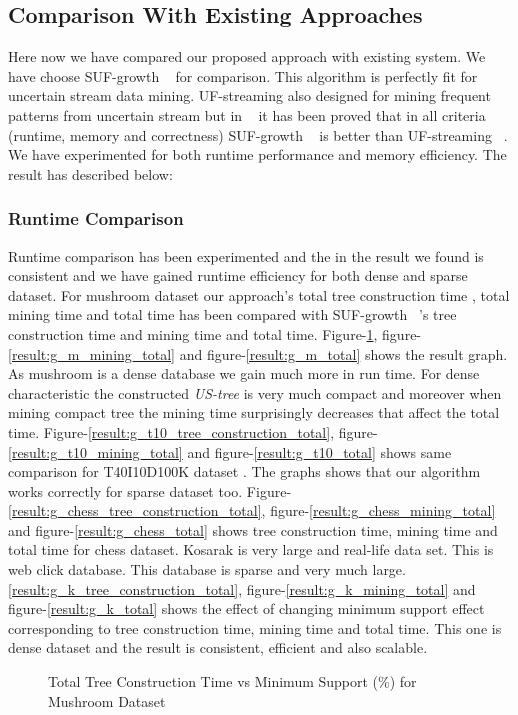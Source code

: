 \subsection{Comparison With Existing Approaches}
Here now we have compared our proposed approach with existing system. We have choose SUF-growth ~\cite{suf_growth}  for comparison. This algorithm is perfectly fit for uncertain stream data mining. UF-streaming also designed for mining frequent patterns from uncertain stream but in ~\cite{suf_growth} it has been proved that in all criteria (runtime, memory and correctness) SUF-growth ~\cite{suf_growth} is better than UF-streaming ~\cite{suf_growth}. We have experimented for both runtime performance and memory efficiency. The result has described below:
    \subsubsection{Runtime Comparison}
    Runtime comparison has been experimented and the in the result we found is consistent and we have gained runtime efficiency for both dense and sparse dataset. For mushroom dataset our approach's total tree construction time , total mining time and total time has been compared with SUF-growth ~\cite{suf_growth}'s tree construction time and mining time and total time. Figure-\ref{result:g_m_tree_construction_total}, figure-\ref{result:g_m_mining_total} and figure-\ref{result:g_m_total} shows the result graph. As mushroom is a dense database we gain much more in run time. For dense characteristic the constructed \emph{US-tree} is very much compact and moreover when mining compact tree the mining time surprisingly decreases that affect the total time. Figure-\ref{result:g_t10_tree_construction_total}, figure-\ref{result:g_t10_mining_total} and figure-\ref{result:g_t10_total} shows same comparison for T40I10D100K dataset . The graphs shows that our algorithm works correctly for sparse dataset too. Figure-\ref{result:g_chess_tree_construction_total}, figure-\ref{result:g_chess_mining_total} and figure-\ref{result:g_chess_total} shows tree construction time, mining time and total time for chess dataset. Kosarak is very large and real-life data set. This is web click database. This database is sparse and very much large. \ref{result:g_k_tree_construction_total}, figure-\ref{result:g_k_mining_total} and figure-\ref{result:g_k_total} shows the effect of changing minimum support effect corresponding to tree construction time, mining time and total time. This one is dense dataset and the result is consistent, efficient and also scalable.
            \begin{figure}[h]
            \centering
                
            \caption{Total Tree Construction Time vs Minimum Support (\%) for Mushroom Dataset }
            \label{result:g_m_tree_construction_total}
            \end{figure}
            
